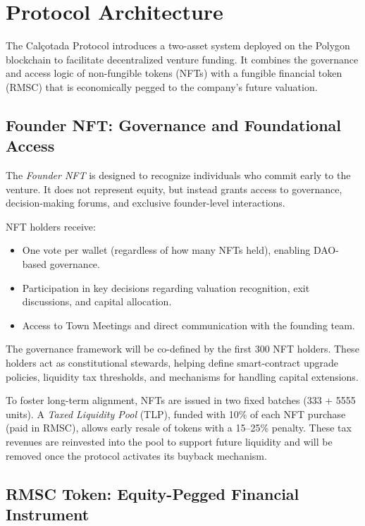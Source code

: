 \documentclass[conference]{IEEEtran}
\begin{document}
\section{Protocol Architecture}

The Calçotada Protocol introduces a two-asset system deployed on the Polygon blockchain to facilitate decentralized venture funding. It combines the governance and access logic of non-fungible tokens (NFTs) with a fungible financial token (RMSC) that is economically pegged to the company’s future valuation.

\subsection{Founder NFT: Governance and Foundational Access}

The \textit{Founder NFT} is designed to recognize individuals who commit early to the venture. It does not represent equity, but instead grants access to governance, decision-making forums, and exclusive founder-level interactions.

NFT holders receive:
\begin{itemize}
    \item One vote per wallet (regardless of how many NFTs held), enabling DAO-based governance.
    \item Participation in key decisions regarding valuation recognition, exit discussions, and capital allocation.
    \item Access to Town Meetings and direct communication with the founding team.
\end{itemize}

The governance framework will be co-defined by the first 300 NFT holders. These holders act as constitutional stewards, helping define smart-contract upgrade policies, liquidity tax thresholds, and mechanisms for handling capital extensions.

To foster long-term alignment, NFTs are issued in two fixed batches (333 + 5555 units). A \textit{Taxed Liquidity Pool} (TLP), funded with 10\% of each NFT purchase (paid in RMSC), allows early resale of tokens with a 15--25\% penalty. These tax revenues are reinvested into the pool to support future liquidity and will be removed once the protocol activates its buyback mechanism.

\subsection{RMSC Token: Equity-Pegged Financial Instrument}
\end{document}
